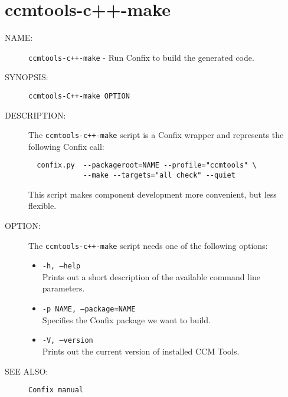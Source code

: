 \section{ccmtools-c++-make}
\begin{description}

\item [NAME:] 
  {\tt ccmtools-c++-make} - Run Confix to build the generated code.

\item [SYNOPSIS:] 
  {\tt ccmtools-C++-make OPTION}

\item [DESCRIPTION:]
  The {\tt ccmtools-c++-make} script is a Confix wrapper and
  represents the following Confix call:
  \begin{small}
  \begin{verbatim}
  confix.py  --packageroot=NAME --profile="ccmtools" \
             --make --targets="all check" --quiet    
  \end{verbatim}
  \end{small}
  This script makes component development more convenient,
  but less flexible. 

\item [OPTION:]
  The {\tt ccmtools-c++-make} script needs one of the following options:
  \begin{itemize}
  \item {\tt -h, --help} \\
    Prints out a short description of the available command line parameters.

  \item {\tt -p NAME, --package=NAME} \\
    Specifies the Confix package we want to build. 

  \item {\tt -V, --version} \\
    Prints out the current version of installed CCM Tools.
  \end{itemize}
  
\item [SEE ALSO:]
  {\tt Confix manual}
  
\end{description}


